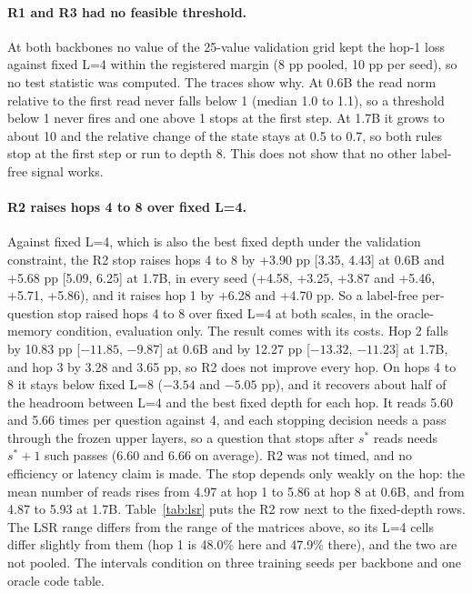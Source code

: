 \paragraph{R1 and R3 had no feasible threshold.}
At both backbones no value of the 25-value validation grid kept the hop-1 loss against fixed L=4 within the registered margin (8 pp pooled, 10 pp per seed), so no test statistic was computed.
The traces show why.
At 0.6B the read norm relative to the first read never falls below 1 (median 1.0 to 1.1), so a threshold below 1 never fires and one above 1 stops at the first step.
At 1.7B it grows to about 10 and the relative change of the state stays at 0.5 to 0.7, so both rules stop at the first step or run to depth 8.
This does not show that no other label-free signal works.  %

\paragraph{R2 raises hops 4 to 8 over fixed L=4.}
Against fixed L=4, which is also the best fixed depth under the validation constraint, the R2 stop raises hops 4 to 8 by +3.90 pp [3.35, 4.43] at 0.6B and +5.68 pp [5.09, 6.25] at 1.7B, in every seed (+4.58, +3.25, +3.87 and +5.46, +5.71, +5.86), and it raises hop 1 by +6.28 and +4.70 pp.
So a label-free per-question stop raised hops 4 to 8 over fixed L=4 at both scales, in the oracle-memory condition, evaluation only.  %
The result comes with its costs.
Hop 2 falls by 10.83 pp [$-11.85$, $-9.87$] at 0.6B and by 12.27 pp [$-13.32$, $-11.23$] at 1.7B, and hop 3 by 3.28 and 3.65 pp, so R2 does not improve every hop.
On hops 4 to 8 it stays below fixed L=8 ($-3.54$ and $-5.05$ pp), and it recovers about half of the headroom between L=4 and the best fixed depth for each hop.
It reads 5.60 and 5.66 times per question against 4, and each stopping decision needs a pass through the frozen upper layers, so a question that stops after $s^{*}$ reads needs $s^{*}+1$ such passes (6.60 and 6.66 on average).
R2 was not timed, and no efficiency or latency claim is made.  %
The stop depends only weakly on the hop: the mean number of reads rises from 4.97 at hop 1 to 5.86 at hop 8 at 0.6B, and from 4.87 to 5.93 at 1.7B.  %
Table~\ref{tab:lsr} puts the R2 row next to the fixed-depth rows.
The LSR range differs from the range of the matrices above, so its L=4 cells differ slightly from them (hop 1 is 48.0\% here and 47.9\% there), and the two are not pooled.  %
The intervals condition on three training seeds per backbone and one oracle code table.

